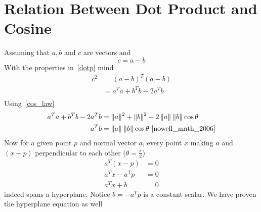 \documentclass{book}
\newcommand{\norm}[2][]{\left\lVert#2\right\rVert_{#1}}
\numberwithin{equation}{subsection}
\begin{document}
\section{Relation Between Dot Product and Cosine} 
Assuming that $a, b$ and $c$ are vectors and
\begin{equation}
    c = a-b
\end{equation} 
With the properties in~\ref{dotp} mind
\begin{align}
    c^2 &= (a-b)^T(a-b)\\
    &= a^Ta +b^Tb - 2a^Tb\\
\end{align}
Using~\ref{cos_law}
\begin{align}
    a^Ta +b^Tb - 2a^Tb &= \norm{a}^2 + \norm{b}^2 - 2\norm{a}\norm{b}\cos \theta\\
    a^Tb &= \norm{a}\norm{b}\cos \theta~\cite{nowell_math_2006}
\end{align}
Now for a given point $p$ and normal vector $a$, every point $x$ making $a$ and $(x-p)$ perpendicular to each other ($\theta = \frac{\pi}{2}$) 
\begin{align}
    a^T(x-p) &= 0\\
    a^Tx-a^Tp &= 0\\
    a^Tx+b &= 0
\end{align}
indeed spans a hyperplane. Notice $b = -a^Tp$ is a constant scalar. We have proven the hyperplane equation as well
\end{document}
